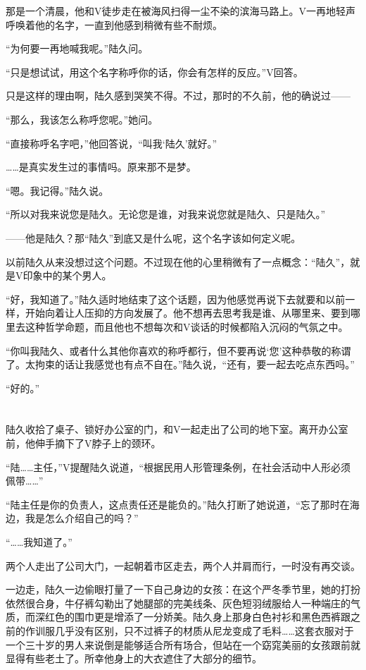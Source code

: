 那是一个清晨，他和V徒步走在被海风扫得一尘不染的滨海马路上。V一再地轻声呼唤着他的名字，一直到他感到稍微有些不耐烦。

“为何要一再地喊我呢。”陆久问。

“只是想试试，用这个名字称呼你的话，你会有怎样的反应。”V回答。

只是这样的理由啊，陆久感到哭笑不得。不过，那时的不久前，他的确说过——

“那么，我该怎么称呼您呢。”她问。

“直接称呼名字吧，”他回答说，“叫我‘陆久’就好。”

……是真实发生过的事情吗。原来那不是梦。

“嗯。我记得。”陆久说。

“所以对我来说您是陆久。无论您是谁，对我来说您就是陆久、只是陆久。”

——他是陆久？那“陆久”到底又是什么呢，这个名字该如何定义呢。

以前陆久从来没想过这个问题。不过现在他的心里稍微有了一点概念：“陆久”，就是V印象中的某个男人。

“好，我知道了。”陆久适时地结束了这个话题，因为他感觉再说下去就要和以前一样，开始向着让人压抑的方向发展了。他不想再去思考我是谁、从哪里来、要到哪里去这种哲学命题，而且他也不想每次和V谈话的时候都陷入沉闷的气氛之中。

“你叫我陆久、或者什么其他你喜欢的称呼都行，但不要再说‘您’这种恭敬的称谓了。太拘束的话让我感觉也有点不自在。”陆久说，“还有，要一起去吃点东西吗。”

“好的。”

\section*{}

陆久收拾了桌子、锁好办公室的门，和V一起走出了公司的地下室。离开办公室前，他伸手摘下了V脖子上的颈环。

“陆……主任，”V提醒陆久说道，“根据民用人形管理条例，在社会活动中人形必须佩带……”

“陆主任是你的负责人，这点责任还是能负的。”陆久打断了她说道，“忘了那时在海边，我是怎么介绍自己的吗？”

“……我知道了。”

两个人走出了公司大门，一起朝着市区走去，两个人并肩而行，一时没有再交谈。

一边走，陆久一边偷眼打量了一下自己身边的女孩：在这个严冬季节里，她的打扮依然很合身，牛仔裤勾勒出了她腿部的完美线条、灰色短羽绒服给人一种端庄的气质，而深红色的围巾更是增添了一分娇美。陆久身上那身白色衬衫和黑色西裤跟之前的作训服几乎没有区别，只不过裤子的材质从尼龙变成了毛料……这套衣服对于一个三十岁的男人来说倒是能够适合所有场合，但站在一个窈窕美丽的女孩跟前就显得有些老土了。所幸他身上的大衣遮住了大部分的细节。

